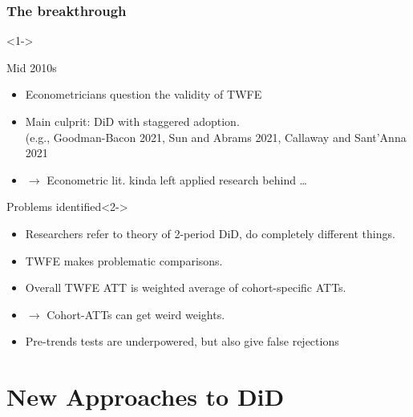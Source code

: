 \documentclass[12pt,aspectratio=169]{beamer}\usepackage[]{graphicx}\usepackage[]{xcolor}
\begin{document}
\begin{frame}[fragile]
\frametitle{The breakthrough}<1->

    \begin{alertblock}{Mid 2010s}
    \small

    \begin{itemize}[itemsep=0em, topsep=0pt]
        \item Econometricians question the validity of TWFE
        \item Main culprit: DiD with staggered adoption.\\{\footnotesize (e.g., Goodman-Bacon 2021, Sun and Abrams 2021, Callaway and Sant'Anna 2021}
        \item $\rightarrow$ Econometric lit. kinda left applied research behind \dots
    \end{itemize}

    \end{alertblock}

    \begin{alertblock}{Problems identified}<2->
    \small

    \begin{itemize}[itemsep=0em, topsep=0pt]
        \item Researchers refer to theory of 2-period DiD, do completely different things.
        \item TWFE makes problematic comparisons.
        \item Overall TWFE ATT is weighted average of cohort-specific ATTs.
        \item $\rightarrow$ Cohort-ATTs can get weird weights.
        \item Pre-trends tests are underpowered, but also give false rejections
    \end{itemize}

    \end{alertblock}

\end{frame}




\section{New Approaches to DiD}
\end{document}
